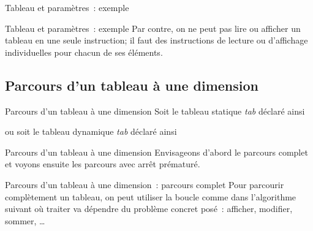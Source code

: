 \begin{frame}{Tableau et paramètres~: exemple}
\end{frame}

\begin{frame}{Tableau et paramètres~: exemple}
	Par contre, on ne peut pas lire ou afficher un tableau en une seule
	instruction; il faut des instructions de lecture ou
	d'affichage individuelles pour chacun de ses éléments.
\end{frame}

\subsection{Parcours d'un tableau à une dimension}

\begin{frame}{Parcours d'un tableau à une dimension}
	Soit le tableau statique \textit{tab} déclaré ainsi

	\bigskip

	
	\bigskip

	ou soit le tableau dynamique \textit{tab} déclaré ainsi
	
	\bigskip

\end{frame}

\begin{frame}{Parcours d'un tableau à une dimension}
	Envisageons d'abord le parcours complet
	et voyons ensuite les parcours avec arrêt prématuré.
\end{frame}

\begin{frame}{Parcours d'un tableau à une dimension~: parcours complet}
	Pour parcourir complètement un tableau, 
	on peut utiliser la boucle 
	comme dans l'algorithme suivant
	où \og{}traiter\fg{} va dépendre du problème concret posé~:
	afficher, modifier, sommer, \dots
\end{frame}

